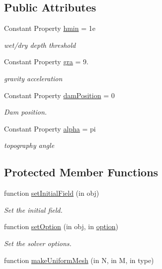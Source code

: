 \subsection*{Public Attributes}
\begin{DoxyCompactItemize}
\item 
Constant Property \hyperlink{class_dam_break_plan_umiform_mesh2d_ad9e0a9dc6c19595be2e6511ed508a9a7}{hmin} = 1e
\begin{DoxyCompactList}\small\item\em wet/dry depth threshold \end{DoxyCompactList}\item 
Constant Property \hyperlink{class_dam_break_plan_umiform_mesh2d_a52f52c2885c57619e6fee804e56b29e5}{gra} = 9.
\begin{DoxyCompactList}\small\item\em gravity acceleration \end{DoxyCompactList}\item 
Constant Property \hyperlink{class_dam_break_plan_umiform_mesh2d_a1f4f96ad55390f4eba046e7ed6663b71}{dam\+Position} = 0
\begin{DoxyCompactList}\small\item\em Dam position. \end{DoxyCompactList}\item 
Constant Property \hyperlink{class_dam_break_plan_umiform_mesh2d_a26bb5fdb2b65f31d37612afb7e2fd513}{alpha} = pi
\begin{DoxyCompactList}\small\item\em topography angle \end{DoxyCompactList}\end{DoxyCompactItemize}
\subsection*{Protected Member Functions}
\begin{DoxyCompactItemize}
\item 
function \hyperlink{class_dam_break_plan_umiform_mesh2d_a5ae7efc580948984aa73fbbda179f610}{set\+Initial\+Field} (in obj)
\begin{DoxyCompactList}\small\item\em Set the initial field. \end{DoxyCompactList}\item 
function \hyperlink{class_dam_break_plan_umiform_mesh2d_a9bbdfc6074d5d8e1964f87d5e0169f15}{set\+Option} (in obj, in \hyperlink{class_ndg_phys_af91f4c54b93504e76b38a5693774dff1}{option})
\begin{DoxyCompactList}\small\item\em Set the solver options. \end{DoxyCompactList}\item 
function \hyperlink{class_dam_break_plan_umiform_mesh2d_afd7a651147d9be68c4e79bdd81be2812}{make\+Uniform\+Mesh} (in N, in M, in type)
\end{DoxyCompactItemize}
